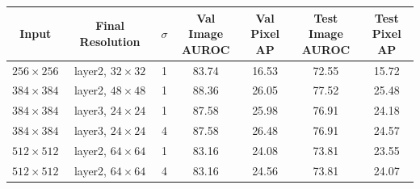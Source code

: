 \begin{table}[ht!]
    \centering
    \small
    \setlength{\tabcolsep}{3pt}
    \begin{tabular}{@{}c c c c c c c@{}}
        \toprule
        \textbf{Input}   & \textbf{Final Resolution} & \textbf{\(\sigma\)} & \shortstack{\textbf{Val Image}\\\textbf{AUROC}} & \shortstack{\textbf{Val}\\\textbf{Pixel AP}} & \shortstack{\textbf{Test Image}\\\textbf{AUROC}} & \shortstack{\textbf{Test}\\\textbf{Pixel AP}} \\
        \midrule
        \midrule
        \(256\times256\) & layer2, \(32\times32\)    & 1                   & 83.74                                           & 16.53                                        & 72.55                                            & 15.72                                         \\
        \(384\times384\) & layer2, \(48\times48\)    & 1                   & 88.36                                           & 26.05                                        & 77.52                                            & 25.48                                         \\
        \(384\times384\) & layer3, \(24\times24\)    & 1                   & 87.58                                           & 25.98                                        & 76.91                                            & 24.18                                         \\
        \(384\times384\) & layer3, \(24\times24\)    & 4                   & 87.58                                           & 26.48                                        & 76.91                                            & 24.57                                         \\
        \(512\times512\) & layer2, \(64\times64\)    & 1                   & 83.16                                           & 24.08                                        & 73.81                                            & 23.55                                         \\
        \(512\times512\) & layer2, \(64\times64\)    & 4                   & 83.16                                           & 24.56                                        & 73.81                                            & 24.07                                         \\

\end{tabular}
\end{table}
